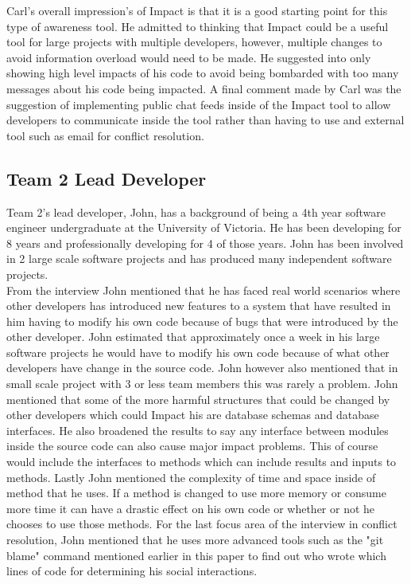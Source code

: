 \documentclass[conference]{IEEEtran}
\begin{document}
Carl's overall impression's of Impact is that it is a good starting point for this type of awareness tool.
He admitted to thinking that Impact could be a useful tool for large projects with multiple developers, however,
multiple changes to avoid information overload would need to be made. He suggested into only showing
high level impacts of his code to avoid being bombarded with too many messages about his code
being impacted. A final comment made by Carl was the suggestion of implementing public chat feeds
inside of the Impact tool to allow developers to communicate inside the tool rather than having to use
and external tool such as email for conflict resolution.\\

\subsection{Team 2 Lead Developer}
Team 2's lead developer, John, has a background of being a 4th year software engineer undergraduate
at the University of Victoria. He has been developing for 8 years and professionally developing for
4 of those years. John has been involved in 2 large scale software projects and has produced
many independent software projects.\\

From the interview John mentioned that he has faced real world scenarios where other developers
has introduced new features to a system that have resulted in him having to modify his own code
because of bugs that were introduced by the other developer. John estimated that approximately
once a week in his large software projects he would have to modify his own code because of what
other developers have change in the source code. John however also mentioned that in small scale project with 3
or less team members this was rarely a problem. John mentioned that some of the more harmful 
structures that could be changed by other developers which could Impact his are database schemas
and database interfaces. He also broadened the results to say any interface between modules
inside the source code can also cause major impact problems.  This of course would include the interfaces
to methods which can include results and inputs to methods. Lastly John mentioned the complexity
of time and space inside of method that he uses. If a method is changed to use more memory or
consume more time it can have a drastic effect on his own code or whether or not he chooses to
use those methods. For the last focus area of the interview in conflict resolution, John mentioned 
that he uses more advanced tools such as the "git blame" command mentioned earlier in this paper
to find out who wrote which lines of code for determining his social interactions.\\
\end{document}
